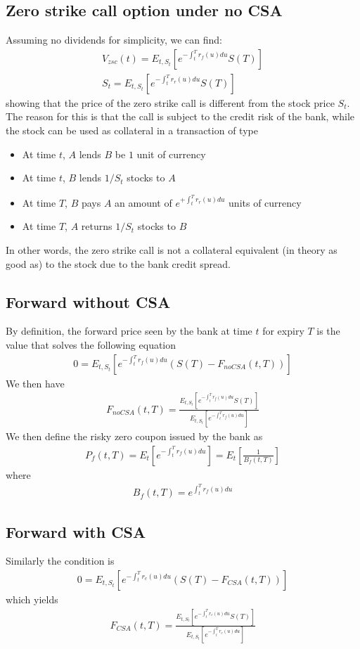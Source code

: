 \documentclass[a4paper,10pt]{report}
\theoremstyle{plain}
\theoremstyle{definition}
\newcommand\be{\begin{eqnarray}}    %
\newcommand\ee{\end{eqnarray}}
\begin{document}
\subsection{Zero strike call option under no CSA}

Assuming no dividends for simplicity, we can find:
\be 
V_{zsc}(t)=E_{t,S_t}\left[ e^{-\int_t^T r_f(u)du} S(T) \right]\\
S_t = E_{t,S_t}\left[ e^{-\int_t^T r_r(u)du} S(T) \right]
\ee
showing that the price of the zero strike call is different from the stock price $S_t$. The reason for this is that the call is subject to the credit risk of the bank, while the stock can be used as collateral in a transaction of type
\begin{itemize}
\item At time $t$, $A$ lends $B$ be $1$ unit of currency 
\item At time $t$, $B$ lends $1/S_t$ stocks to $A$
\item At time $T$, $B$ pays $A$ an amount of $e^{+\int_t^T r_r(u)du}$ units of currency
\item At time $T$, $A$ returns $1/S_t$ stocks to $B$
\end{itemize}
In other words, the zero strike call is not a collateral equivalent (in theory as good as) to the stock due to the bank credit spread.

\subsection{Forward without CSA}

By definition, the forward price seen by the bank at time $t$ for expiry $T$ is the value that solves the following equation
\be 
0=E_{t,S_t}\left[ e^{-\int_t^T r_f(u)du} \left(S(T)-F_{noCSA}(t,T)\right)\right]
\ee
We then have
\be 
\label{fnocsa}
F_{noCSA}(t,T) = \frac{E_{t,S_t}\left[ e^{-\int_t^T r_f(u)du} S(T)\right]}{E_{t,S_t}\left[ e^{-\int_t^T r_f(u)du}\right]}
\ee
We then define the risky zero coupon issued by the bank as
\be 
P_f(t,T)=E_{t}\left[ e^{-\int_t^T r_f(u)du}\right]=E_{t}\left[ \frac{1}{B_f(t,T)}\right]
\ee
where
\be
 B_f(t,T)=e^{\int_t^T r_f(u)du}
\ee
\subsection{Forward with CSA}

Similarly the condition is
\be 
0=E_{t,S_t}\left[ e^{-\int_t^T r_c(u)du} \left(S(T)-F_{CSA}(t,T)\right)\right]
\ee
which yields
\be 
F_{CSA}(t,T)=\frac{E_{t,S_t}\left[ e^{-\int_t^T r_c(u)du} S(T)\right]}{E_{t,S_t}\left[ e^{-\int_t^T r_c(u)du}\right]}
\ee
\end{document}
